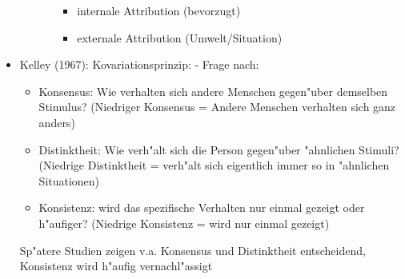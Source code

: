 \begin{itemize}
\begin{enumerate}
\begin{itemize}
\begin{itemize}
							\item
								internale Attribution (bevorzugt)
							\item
								externale Attribution (Umwelt/Situation)
						\end{itemize}
				\end{itemize}
		\end{enumerate}
	\item
		Kelley (1967): Kovariationsprinzip: - Frage nach:
		\begin{itemize}
			\item Konsensus: Wie verhalten sich andere Menschen gegen"uber demselben Stimulus? (Niedriger Konsensus = Andere Menschen verhalten sich ganz anders)
			\item
				Distinktheit: Wie verh"alt sich die Person gegen"uber "ahnlichen Stimuli? (Niedrige Distinktheit = verh"alt sich eigentlich immer so in "ahnlichen Situationen)
			\item
				Konsistenz: wird das spezifische Verhalten nur einmal gezeigt oder h"aufiger? (Niedrige Konsistenz = wird nur einmal gezeigt)
		\end{itemize}
		Sp"atere Studien zeigen v.a. Konsensus und Distinktheit entscheidend, Konsistenz wird h"aufig vernachl"assigt
\end{itemize}

